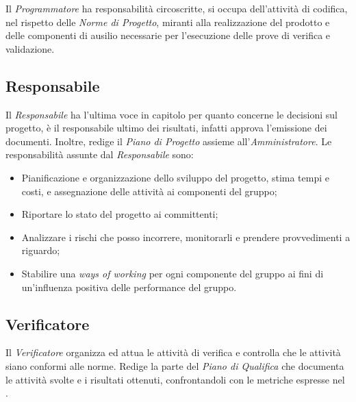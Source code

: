 	Il \textit{Programmatore} ha responsabilità circoscritte, si occupa dell'attività di codifica, nel rispetto delle \textit{Norme di Progetto}, miranti alla realizzazione del prodotto e delle componenti di ausilio necessarie per l'esecuzione delle prove di verifica e validazione.


	\subsection{Responsabile}
	
	Il \textit{Responsabile} ha l'ultima voce in capitolo per quanto concerne le decisioni sul progetto, è il responsabile ultimo dei risultati, infatti approva l'emissione dei documenti. Inoltre, redige il \textit{Piano di Progetto} assieme all'\textit{Amministratore}. 
	Le responsabilità assunte dal \textit{Responsabile} sono:

	\begin{itemize}

		\item Pianificazione e organizzazione dello sviluppo del progetto, stima tempi e costi, e assegnazione delle attività ai componenti del gruppo;
		\item Riportare lo stato del progetto ai committenti;
		\item Analizzare i rischi che posso incorrere, monitorarli e prendere provvedimenti a riguardo;
		\item Stabilire una \textit{ways of working} per ogni componente del gruppo ai fini di un'influenza positiva delle performance del gruppo.
	
	\end{itemize}

	
	\subsection{Verificatore}

	Il \textit{Verificatore} organizza ed attua le attività di verifica e controlla che le attività siano conformi alle norme. Redige la parte del \textit{Piano di Qualifica} che documenta le attività svolte e i risultati ottenuti, confrontandoli con le metriche espresse nel \PianoDiQualifica. 